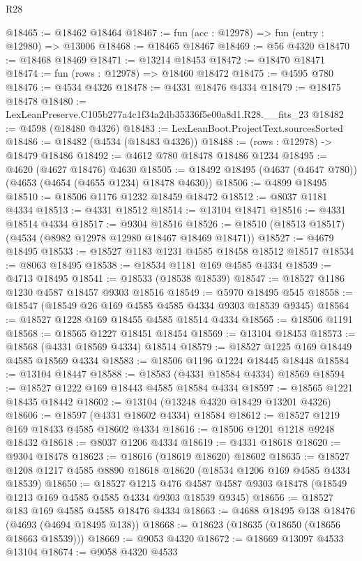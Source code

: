 \begin{lexlean}{R28}
\begin{coremodule}
@18465 := @18462 @18464
@18467 := fun (acc : @12978) => fun (entry : @12980) => @13006
@18468 := @18465 @18467
@18469 := @56 @4320
@18470 := @18468 @18469
@18471 := @13214 @18453
@18472 := @18470 @18471
@18474 := fun (rows : @12978) => @18460 @18472
@18475 := @4595 @780
@18476 := @4534 @4326
@18478 := @4331 @18476 @4334
@18479 := @18475 @18478
@18480 := LexLeanPreserve.C105b277a4c1f34a2db35336f5e00a8d1.R28.__fits_23
@18482 := @4598 (@18480 @4326)
@18483 := LexLeanBoot.ProjectText.sourcesSorted
@18486 := @18482 (@4534 (@18483 @4326))
@18488 := (rows : @12978) -> @18479 @18486
@18492 := @4612 @780 @18478 @18486 @1234
@18495 := @4620 (@4627 @18476) @4630
@18505 := @18492 @18495 (@4637 (@4647 @780)) (@4653 (@4654 (@4655 @1234) @18478 @4630))
@18506 := @4899 @18495
@18510 := @18506 @1176 @1232 @18459 @18472
@18512 := @8037 @1181 @4334
@18513 := @4331 @18512
@18514 := @13104 @18471
@18516 := @4331 @18514 @4334
@18517 := @9304 @18516
@18526 := @18510 (@18513 @18517) (@4534 (@8982 @12978 @12980 @18467 @18469 @18471))
@18527 := @4679 @18495
@18533 := @18527 @1183 @1231 @4585 @18458 @18512 @18517
@18534 := @8063 @18495
@18538 := @18534 @1181 @169 @4585 @4334
@18539 := @4713 @18495
@18541 := @18533 (@18538 @18539)
@18547 := @18527 @1186 @1230 @4587 @18457 @9303 @18516
@18549 := @5970 @18495 @545
@18558 := @18547 (@18549 @26 @169 @4585 @4585 @4334 @9303 @18539 @9345)
@18564 := @18527 @1228 @169 @18455 @4585 @18514 @4334
@18565 := @18506 @1191
@18568 := @18565 @1227 @18451 @18454
@18569 := @13104 @18453
@18573 := @18568 (@4331 @18569 @4334) @18514
@18579 := @18527 @1225 @169 @18449 @4585 @18569 @4334
@18583 := @18506 @1196 @1224 @18445 @18448
@18584 := @13104 @18447
@18588 := @18583 (@4331 @18584 @4334) @18569
@18594 := @18527 @1222 @169 @18443 @4585 @18584 @4334
@18597 := @18565 @1221 @18435 @18442
@18602 := @13104 (@13248 @4320 @18429 @13201 @4326)
@18606 := @18597 (@4331 @18602 @4334) @18584
@18612 := @18527 @1219 @169 @18433 @4585 @18602 @4334
@18616 := @18506 @1201 @1218 @9248 @18432
@18618 := @8037 @1206 @4334
@18619 := @4331 @18618
@18620 := @9304 @18478
@18623 := @18616 (@18619 @18620) @18602
@18635 := @18527 @1208 @1217 @4585 @8890 @18618 @18620 (@18534 @1206 @169 @4585 @4334 @18539)
@18650 := @18527
    @1215
    @476
    @4587
    @4587
    @9303
    @18478
    (@18549 @1213 @169 @4585 @4585 @4334 @9303 @18539 @9345)
@18656 := @18527 @183 @169 @4585 @4585 @18476 @4334
@18663 := @4688 @18495 @138 @18476 (@4693 (@4694 @18495 @138))
@18668 := @18623 (@18635 (@18650 (@18656 @18663 @18539)))
@18669 := @9053 @4320
@18672 := @18669 @13097 @4533 @13104
@18674 := @9058 @4320 @4533

\end{coremodule}
\end{lexlean}

